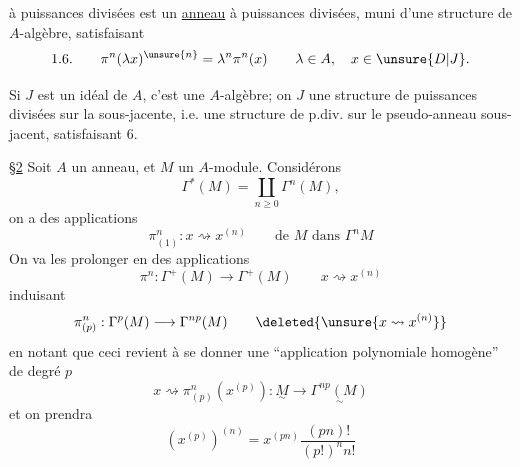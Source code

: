 à puissances divisées est un \uline{anneau} à puissances divisées, muni d'une structure de $A$-algèbre, satisfaisant
\[
1.6.\qquad\pi^n(\lambda x)^{\unsure{n}}=\lambda^n\pi^n(x)\qquad\lambda\in A,\quad x\in\unsure{D|J}.
\]

Si $J$ est un idéal de $A$, c'est une $A$-algèbre; on   $J$ une structure de puissances divisées sur la   sous-jacente, i.e. une structure de p.div. sur le pseudo-anneau sous-jacent, satisfaisant 6.

\uline{\S2} Soit $A$ un anneau, et $M$ un $A$-module. Considérons 
\[
\Gamma^*(M)=\coprod_{n\ge0}\Gamma^n(M),
\]
on a des applications
\[
\pi^n_{(1)}:x\rightsquigarrow x^{(n)}\qquad\text{de }M\text{ dans }\Gamma^nM
\]
On va les prolonger en des applications
\[
\pi^n:\Gamma^+(M)\longrightarrow\Gamma^+(M)\qquad x\rightsquigarrow x^{(n)}
\]
induisant
\[
\pi^n_{(p)}:\Gamma^p(M)\longrightarrow\Gamma^{np}(M)\qquad\deleted{\unsure{x\rightsquigarrow x^{(n)}}}
\]
en notant que ceci revient à se donner une ``application polynomiale homogène'' de degré $p$
\[
x\rightsquigarrow\pi^n_{(p)}(x^{(p)}):\underset{\sim}{M}\longrightarrow\underset{\sim}{\Gamma^{np}(M)}
\]
et on prendra
\[
(x^{(p)})^{(n)}=x^{(pn)}\frac{(pn)!}{(p!)^n n!}
\]
